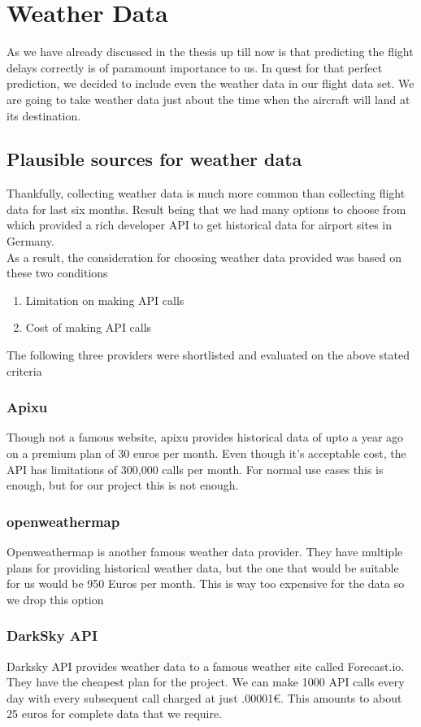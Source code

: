 \chapter{Weather Data}
As we have already discussed in the thesis up till now is that predicting the flight delays correctly is of paramount importance to us. In quest for that perfect prediction, we decided to include even the weather data in our flight data set. We are going to take weather data just about the time when the aircraft will land at its destination. 

\section{Plausible sources for weather data}
Thankfully, collecting weather data is much more common than collecting flight data for last six months. Result being that we had many options to choose from which provided a rich developer API to get historical data for airport sites in Germany.
\\As a result, the consideration for choosing weather data provided was based on these two conditions
\begin{enumerate}
    \item Limitation on making API calls
    \item Cost of making API calls
\end{enumerate}
The following three providers were shortlisted and evaluated on the above stated criteria
\subsection{Apixu}
Though not a famous website, apixu provides historical data of upto a year ago on a premium plan of 30 euros per month. Even though it's acceptable cost, the API has limitations of 300,000 calls per month. For normal use cases this is enough, but for our project this is not enough.

\subsection{openweathermap}
Openweathermap is another famous weather data provider. They have multiple plans for providing historical weather data, but the one that would be suitable for us would be 950 Euros per month. This is way too expensive for the data so we drop this option
\subsection{DarkSky API}
Darksky API provides weather data to a famous weather site called Forecast.io. They have the cheapest plan for the project. We can make 1000 API calls every day with every subsequent call charged at just .00001€. This amounts to about 25 euros for complete data that we require. 

